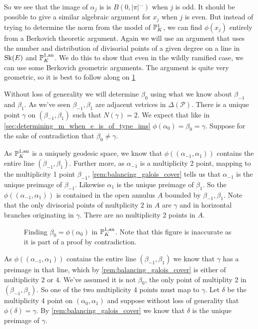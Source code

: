 So we see that the image of $\alpha_{j}$ is is $B(0, |\pi|^{\ldots})$ when $j$ is odd. 
It should be possible to give a similar algebraic argument for $x_{j}$ when $j$ is even.
But instead of trying to determine the norm from the model of $\mathbb{P}^{1}_K$, we can find $\phi(x_j)$ entirely from a Berkovich theoretic argument. 
Again we will use an argument that uses the number and distribution of divisorial points of a given degree on a line in $\operatorname{Sk}(E)$ and $\mathbb{P}^{1, \text{an}}_K$.
We do this to show that even in the wildly ramified case, we can use some Berkovich geometric arguments. 
The argument is quite very geometric, so it is best to follow along on \cref{fig:argument_ims_wild}

\medskip

Without loss of generality we will determine $\beta_0$ using what we know about $\beta_{-1}$ and $\beta_1$. 
As we've seen $\beta_{-1}, \beta_{1}$ are adjacent vetrices in $\Delta(\mathscr P)$. 
There is a unique point $\gamma$ on $(\beta_{-1}, \beta_1)$ such that $N(\gamma) = 2$.  
We expect that like in \cref{sec:determining_m_when_e_is_of_type_ims} $\phi(\alpha_0) = \beta_0 = \gamma$. 
Suppose for the sake of contradiction that $\beta_0 \ne \gamma$.



As $\mathbb{P}^{1, \text{an}}_K$ is a uniquely geodesic space, we know that $\phi((\alpha_{-1}, \alpha_{1}))$ contains the entire line  $(\beta_{-1}, \beta_1)$. 
Further more, as $\alpha_{-1}$ is a multiplicity 2 point, mapping to the multiplicity 1 point $\beta_{-1}$, \cref{rem:balancing_galois_cover} tells us that $\alpha_{-1}$ is the unique preimage of $\beta_{-1}$. 
Likewise $\alpha_1$ is the unique preimage of $\beta_1$. 
So the $\phi((\alpha_{-1}, \alpha_{1}))$ is contained in the open annulus $A$ bounded by $\beta_{-1}, \beta_1$.
Note that the only divisorial points of multplicity 2 in $A$ are $\gamma$ and in horizontal branches originating in $\gamma$. There are no multiplicity 2 points in  $A$. 
\begin{figure}[ht]
    \centering
    \caption{Finding $\beta_0 = \phi(\alpha_0)$ in $\mathbb{P}^{1,\text{an}}_{K}$. 
    Note that this figure is inaccurate as it is part of a proof by contradiction.}
    \label{fig:argument_ims_wild}
\end{figure}
As $\phi((\alpha_{-1}, \alpha_{1}))$ contains the entire line $(\beta_{-1}, \beta_1)$ we know that $\gamma$ has a preimage in that line, which by \cref{rem:balancing_galois_cover} is either of multiplicity $2$ or $4$. 
We've assumed it is not $\beta_0$, the only point of multiplity 2 in  $(\beta_{-1}, \beta_1)$.
So one of the two multiplicity 4 points must map to $\gamma$. 
Let $\delta$ be the multiplicity 4 point on $(\alpha_0, \alpha_1)$ and suppose without loss of generality that $\phi(\delta) = \gamma$. 
By \cref{rem:balancing_galois_cover} we know that $\delta$ is the unique preimage of $\gamma$. 

